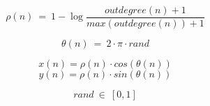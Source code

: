 \documentclass[12pt]{article}
\begin{document}



\begin{equation}
\rho(n)~=~1-\log \frac{outdegree(n)+1}{max(outdegree(n))+1}
\end{equation}

\begin{equation}
\theta (n)~=~2 \cdot \pi \cdot rand
\end{equation}


\begin{equation}
x(n)=\rho(n) \cdot cos(\theta(n)) 
\end{equation}
\begin{equation}
y(n)=\rho(n) \cdot sin(\theta(n)) 
\end{equation}

\begin{equation}
rand~\in~[0,1]
\end{equation}
\end{document}
